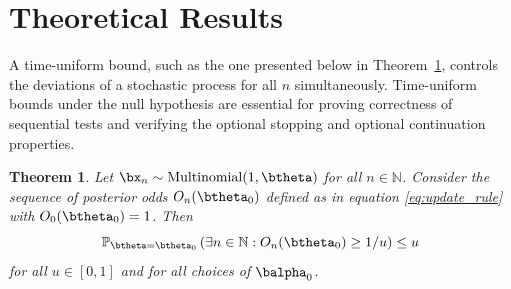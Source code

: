\documentclass[11pt]{article}
\newtheorem{thm}{Theorem}[section]
\begin{document}
\section{Theoretical Results}
\label{sec:theory}
A time-uniform bound, such as the one presented below in Theorem~\ref{thm:type_1_error}, controls the deviations of a stochastic process for all $n$ simultaneously.
Time-uniform bounds under the null hypothesis are essential for proving correctness of sequential tests and verifying the optional stopping and optional continuation properties.
\begin{thm}  
  \label{thm:type_1_error}
  Let $\bx_n\sim \mathrm{Multinomial}(1,\btheta)$ for all $n \in \mathbb{N}$.
Consider the sequence of posterior odds $O_n(\btheta_0)$ defined as in equation \eqref{eq:update_rule} with $O_0(\btheta_0)=1$. Then
\begin{equation}
  \label{eq:type_1_error}
  \mathbb{P}_{\btheta = \btheta_0}\left( \exists n \in \mathbb{N}: O_n(\btheta_0) \geq 1/u \right) \leq u
\end{equation}
for all $u \in [0,1]$ and for all choices of $\balpha_0$.
\end{thm}
\end{document}
